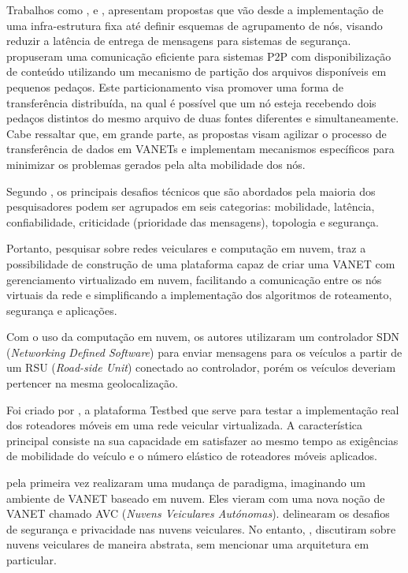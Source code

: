 \documentclass[
	12pt,				%
	oneside,			%
	a4paper,			%
	english,			%
	brazil				%
	]{abntex2ppgsi}
\begin{document}
Trabalhos como  ,  e , apresentam propostas que vão desde a implementação de uma infra-estrutura fixa até definir esquemas de agrupamento de nós, visando reduzir a latência de entrega de mensagens para sistemas de segurança.  propuseram uma comunicação eficiente para sistemas P2P com disponibilização de conteúdo utilizando um mecanismo de partição dos arquivos disponíveis em pequenos pedaços.  Este particionamento visa promover uma forma de transferência distribuída,  na qual é possível que um nó esteja recebendo dois pedaços distintos do mesmo arquivo de duas fontes diferentes e simultaneamente.  Cabe ressaltar que, em grande parte, as propostas visam agilizar o processo de transferência de dados em VANETs e implementam mecanismos específicos para minimizar os problemas gerados pela alta mobilidade dos nós.

Segundo , os principais desafios técnicos que são abordados pela maioria dos pesquisadores podem ser agrupados em seis categorias: mobilidade, latência, confiabilidade, criticidade (prioridade das mensagens), topologia e segurança. 

Portanto, pesquisar sobre redes veiculares e computação em nuvem, traz a possibilidade de construção de uma plataforma capaz de criar uma VANET com gerenciamento virtualizado em nuvem, facilitando a comunicação entre os nós virtuais da rede e simplificando a implementação dos algoritmos de roteamento, segurança e aplicações.

Com o uso da computação em nuvem, os autores   utilizaram um controlador SDN (\textit{Networking Defined Software}) para enviar mensagens para os veículos a partir de um RSU (\textit{Road-side Unit}) conectado ao controlador, porém os veículos deveriam pertencer na mesma geolocalização.

Foi criado por , a plataforma Testbed que serve para testar a implementação real dos roteadores móveis em uma rede veicular virtualizada. A característica principal consiste na sua capacidade em satisfazer ao mesmo tempo as exigências de mobilidade do veículo e o número elástico de roteadores móveis aplicados.

 pela primeira vez realizaram uma mudança de paradigma, imaginando um ambiente de VANET baseado em nuvem. Eles vieram com uma nova noção de VANET chamado AVC (\textit{Nuvens Veiculares Autónomas}).   delinearam os desafios de segurança e privacidade nas nuvens veiculares. No entanto, , discutiram sobre nuvens veiculares de maneira abstrata, sem mencionar uma arquitetura em  particular. 
\end{document}
